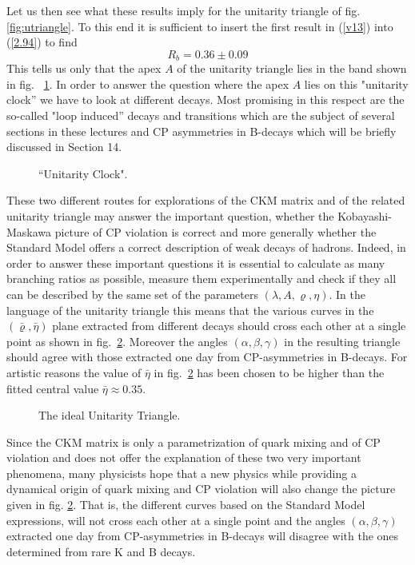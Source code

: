 \documentclass[12pt]{article}
\newcommand{\be}{\begin{equation}}
\newcommand{\ee}{\end{equation}}
\begin{document}
\begin{itemize}
Let us then see what these results imply for the unitarity triangle
of fig. \ref{fig:utriangle}. To this end it is sufficient to insert
the first result in (\ref{v13}) into (\ref{2.94}) to find
\be
 R_b=0.36\pm 0.09
\ee
This tells us only that the apex $A$ of the unitarity triangle lies
in the band shown in fig. \ \ref{L:2}. In order to answer the question where
the apex $A$ lies on this "unitarity clock'' we have to look at different
decays. Most promising in this respect are the so-called "loop induced''
decays and transitions which are the subject of several sections in these
lectures
and CP asymmetries in B-decays which will be briefly discussed in Section 14.
\begin{figure}[hbt]
\vspace{0.001in}
\centerline{
\epsfysize=4in
}
\vspace{0.005in}
\caption[]{``Unitarity Clock".
\label{L:2}}
\end{figure}
These two different routes for explorations of the CKM matrix
and of the related unitarity triangle may answer the important question, 
whether
the Kobayashi-Maskawa picture
of CP violation is correct and more generally whether the Standard
Model offers a correct description of weak decays of hadrons. Indeed,
in order
to answer these important questions it is essential to calculate as
many branching ratios as possible, measure them experimentally and
check if they all can be described by the same set of the parameters
$(\lambda,A,\varrho,\eta)$. In the language of the unitarity triangle
this means that the various curves in the $(\bar\varrho,\bar\eta)$ plane
extracted from different decays should cross each other at a single point
as shown in fig.~\ref{fig:2011}.
Moreover the angles $(\alpha,\beta,\gamma)$ in the
resulting triangle should agree with those extracted one day from
CP-asymmetries in B-decays. For artistic reasons the value of
$\bar\eta$ in fig.~\ref{fig:2011}
has been chosen to be higher than the fitted central value
$\bar\eta\approx 0.35.$
\begin{figure}[hbt]
\vspace{0.10in}
\centerline{
\epsfysize=4.3in
}
\vspace{0.08in}
\caption[]{
The ideal Unitarity Triangle. 
\label{fig:2011}}
\end{figure}

Since the CKM matrix is only a parametrization of quark mixing and 
of CP violation and does not offer the explanation of these two
very important phenomena, many physicists hope that a new physics
while providing a dynamical origin of quark mixing and CP violation will
also change the picture given in fig. \ref{fig:2011}. 
That is, the different curves
based on the Standard Model expressions, will not cross each other 
at a single point
and the angles $(\alpha,\beta,\gamma)$ 
extracted one day from
CP-asymmetries in B-decays will disagree with the ones determined from
rare K and B decays.


\end{itemize}
\end{document}
